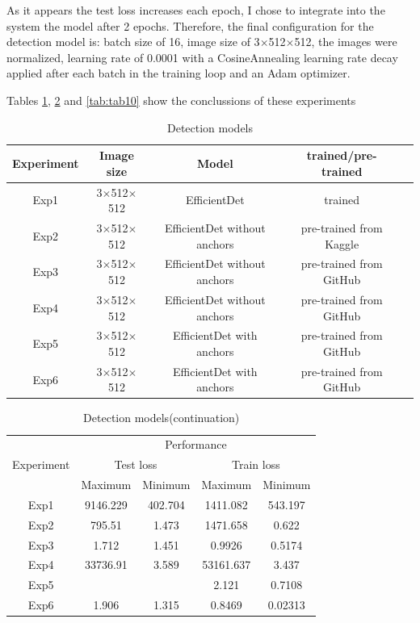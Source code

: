 As it appears the test loss increases each epoch, I chose to integrate into the system the model after 2 epochs. Therefore, the final configuration for the detection model is: batch size of 16, image size of 3$\times$512$\times$512, the images were normalized, learning rate of 0.0001 with a CosineAnnealing learning rate decay applied after each batch in the training loop and an Adam optimizer.

Tables \ref{tab:tab8}, \ref{tab:tab9} and \ref{tab:tab10} show the conclussions of these experiments

\begin{table}[!ht]
    \centering
    \begin{tabular}{|c|c|c|c|c|}
        \hline
        Experiment  & Image size & Model & trained/pre-trained\\
        \hline\hline
        Exp1 & 3$\times$512$\times$512 & EfficientDet & trained\\
        \hline
        Exp2 & 3$\times$512$\times$512 & EfficientDet without anchors & pre-trained from Kaggle\\
        \hline
        Exp3 & 3$\times$512$\times$512 & EfficientDet without anchors & pre-trained from GitHub \\
        \hline
        Exp4 & 3$\times$512$\times$512 & EfficientDet without anchors & pre-trained from GitHub \\
        \hline
        Exp5 & 3$\times$512$\times$512 & EfficientDet with anchors & pre-trained from GitHub \\
        \hline 
        Exp6 & 3$\times$512$\times$512 & EfficientDet with anchors & pre-trained from GitHub \\
        \hline
    \end{tabular}
    \caption{Detection models}
    \label{tab:tab8}
\end{table}

\begin{table}[H]
    \centering
    \begin{tabular}{|c|c|c|c|c|}
        \hline
        \multirow{3}{5em}{Experiment}  & \multicolumn{4}{c|}{Performance}
        \\ \cline{2-5}
         & \multicolumn{2}{c|}{Test loss} & \multicolumn{2}{c|}{Train loss}
         \\ \cline{2-5}
         & Maximum & Minimum & Maximum & Minimum \\
        \hline \hline
        Exp1 & 9146.229 & 402.704 & 1411.082 & 543.197 \\ \hline
        Exp2 & 795.51 & 1.473 & 1471.658 & 0.622 \\ \hline
        Exp3 & 1.712 & 1.451 & 0.9926 & 0.5174 \\ \hline
        Exp4 & 33736.91 & 3.589 & 53161.637 & 3.437\\ \hline
        Exp5 & & & 2.121 & 0.7108 \\ \hline
        Exp6 & 1.906 & 1.315 & 0.8469 & 0.02313\\ \hline

    \end{tabular}
    \caption{Detection models(continuation)}
    \label{tab:tab9}
\end{table}

